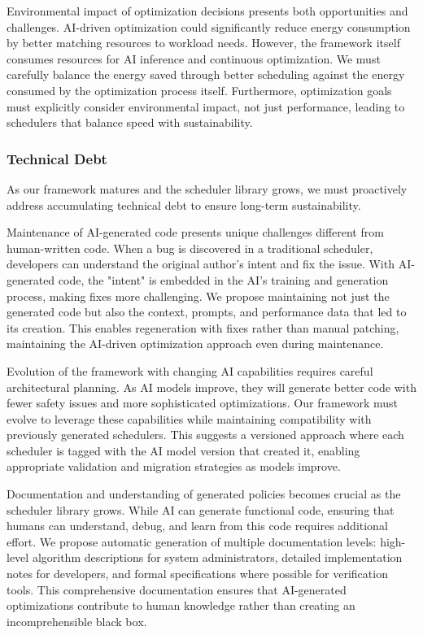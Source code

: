 Environmental impact of optimization decisions presents both opportunities and challenges. AI-driven optimization could significantly reduce energy consumption by better matching resources to workload needs. However, the framework itself consumes resources for AI inference and continuous optimization. We must carefully balance the energy saved through better scheduling against the energy consumed by the optimization process itself. Furthermore, optimization goals must explicitly consider environmental impact, not just performance, leading to schedulers that balance speed with sustainability.

\subsubsection{Technical Debt}
As our framework matures and the scheduler library grows, we must proactively address accumulating technical debt to ensure long-term sustainability.

Maintenance of AI-generated code presents unique challenges different from human-written code. When a bug is discovered in a traditional scheduler, developers can understand the original author's intent and fix the issue. With AI-generated code, the "intent" is embedded in the AI's training and generation process, making fixes more challenging. We propose maintaining not just the generated code but also the context, prompts, and performance data that led to its creation. This enables regeneration with fixes rather than manual patching, maintaining the AI-driven optimization approach even during maintenance.

Evolution of the framework with changing AI capabilities requires careful architectural planning. As AI models improve, they will generate better code with fewer safety issues and more sophisticated optimizations. Our framework must evolve to leverage these capabilities while maintaining compatibility with previously generated schedulers. This suggests a versioned approach where each scheduler is tagged with the AI model version that created it, enabling appropriate validation and migration strategies as models improve.

Documentation and understanding of generated policies becomes crucial as the scheduler library grows. While AI can generate functional code, ensuring that humans can understand, debug, and learn from this code requires additional effort. We propose automatic generation of multiple documentation levels: high-level algorithm descriptions for system administrators, detailed implementation notes for developers, and formal specifications where possible for verification tools. This comprehensive documentation ensures that AI-generated optimizations contribute to human knowledge rather than creating an incomprehensible black box.

